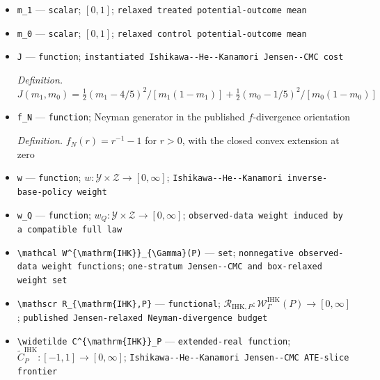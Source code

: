 \documentclass{article}
\begin{document}
\begin{itemize}
  \item \texttt{m\_\allowbreak{}1} --- \texttt{scalar}; \([0,1]\); \texttt{relaxed treated potential-\allowbreak{}outcome mean}
  \item \texttt{m\_\allowbreak{}0} --- \texttt{scalar}; \([0,1]\); \texttt{relaxed control potential-\allowbreak{}outcome mean}
  \item \texttt{J} --- \texttt{function}; \texttt{instantiated Ishikawa-\allowbreak{}-\allowbreak{}He-\allowbreak{}-\allowbreak{}Kanamori Jensen-\allowbreak{}-\allowbreak{}CMC cost}
  \par\smallskip\noindent\emph{Definition.} \(J(m_1,m_0)=\tfrac12(m_1-4/5)^2/[m_1(1-m_1)]+\tfrac12(m_0-1/5)^2/[m_0(1-m_0)]\)
  \item \texttt{f\_\allowbreak{}N} --- \texttt{function}; Neyman generator in the published \(f\)-divergence orientation
  \par\smallskip\noindent\emph{Definition.} \(f_N(r)=r^{-1}-1\) for \(r>0\), with the closed convex extension at zero
  \item \texttt{w} --- \texttt{function}; \(w:\mathcal Y\times\mathcal Z\to[0,\infty]\); \texttt{Ishikawa-\allowbreak{}-\allowbreak{}He-\allowbreak{}-\allowbreak{}Kanamori inverse-\allowbreak{}base-\allowbreak{}policy weight}
  \item \texttt{w\_\allowbreak{}Q} --- \texttt{function}; \(w_Q:\mathcal Y\times\mathcal Z\to[0,\infty]\); \texttt{observed-\allowbreak{}data weight induced by a compatible full law}
  \item \texttt{\textbackslash{}\allowbreak{}mathcal W\textasciicircum{}\{\textbackslash{}\allowbreak{}mathrm\{IHK\}\allowbreak{}\}\allowbreak{}\_\allowbreak{}\{\textbackslash{}\allowbreak{}Gamma\}\allowbreak{}(P)} --- \texttt{set}; \texttt{nonnegative observed-\allowbreak{}data weight functions}; \texttt{one-\allowbreak{}stratum Jensen-\allowbreak{}-\allowbreak{}CMC and box-\allowbreak{}relaxed weight set}
  \item \texttt{\textbackslash{}\allowbreak{}mathscr R\_\allowbreak{}\{\textbackslash{}\allowbreak{}mathrm\{IHK\}\allowbreak{},\allowbreak{}P\}\allowbreak{}} --- \texttt{functional}; \(\mathscr R_{\mathrm{IHK},P}:\mathcal W^{\mathrm{IHK}}_{\Gamma}(P)\to[0,\infty]\); \texttt{published Jensen-\allowbreak{}relaxed Neyman-\allowbreak{}divergence budget}
  \item \texttt{\textbackslash{}\allowbreak{}widetilde C\textasciicircum{}\{\textbackslash{}\allowbreak{}mathrm\{IHK\}\allowbreak{}\}\allowbreak{}\_\allowbreak{}P} --- \texttt{extended-\allowbreak{}real function}; \(\widetilde C^{\mathrm{IHK}}_P:[-1,1]\to[0,\infty]\); \texttt{Ishikawa-\allowbreak{}-\allowbreak{}He-\allowbreak{}-\allowbreak{}Kanamori Jensen-\allowbreak{}-\allowbreak{}CMC ATE-\allowbreak{}slice frontier}

\end{itemize}
\end{document}
